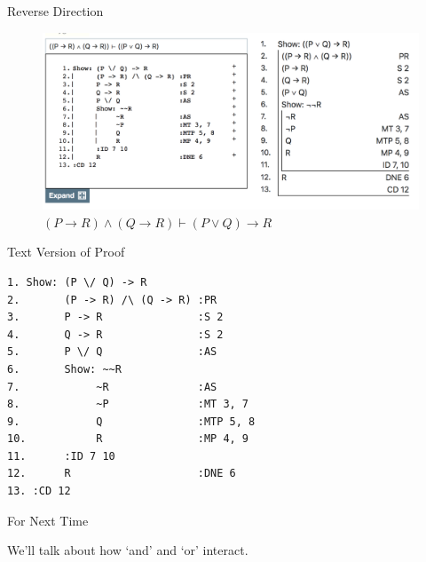 \documentclass[
  ignorenonframetext,
]{beamer}
\renewcommand{\,}{\text{, }}
\begin{document}
\begin{frame}{Reverse Direction}
\protect\hypertarget{reverse-direction}{}

\begin{figure}
\centering
\includegraphics{../images/class05/Class-05-2.png}
\caption{\((P \rightarrow R) \wedge (Q \rightarrow R) \vdash (P \vee Q) \rightarrow R\)}
\end{figure}

\end{frame}

\begin{frame}[fragile]{Text Version of Proof}
\protect\hypertarget{text-version-of-proof-1}{}

\begin{verbatim}
1. Show: (P \/ Q) -> R
2.       (P -> R) /\ (Q -> R) :PR
3.       P -> R               :S 2
4.       Q -> R               :S 2
5.       P \/ Q               :AS
6.       Show: ~~R
7.            ~R              :AS
8.            ~P              :MT 3, 7
9.            Q               :MTP 5, 8
10.           R               :MP 4, 9
11.      :ID 7 10
12.      R                    :DNE 6
13. :CD 12
\end{verbatim}

\end{frame}

\begin{frame}{For Next Time}
\protect\hypertarget{for-next-time}{}

We'll talk about how `and' and `or' interact.

\end{frame}
\end{document}
